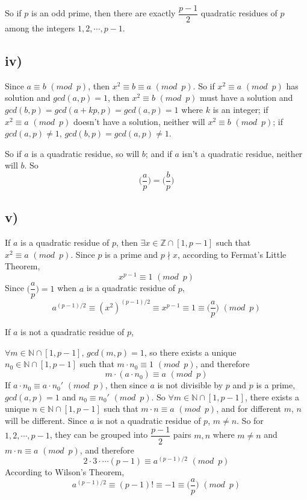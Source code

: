 \documentclass[a4paper,12pt,titlepage]{article}
\begin{document}
So if $p$ is an odd prime, then there are exactly $\dfrac{p-1}{2}$ quadratic residues of $p$ among the integers $1, 2,\cdots,p - 1$.

\subsection*{iv)}
Since $a\equiv b\,\,(mod\,\,\,p)$, then
$x^2\equiv b\equiv a\,\,(mod\,\,\,p)$. So if $x^2\equiv a\,\,(mod\,\,\,p)$ has solution and $gcd(a,p)=1$, then $x^2\equiv b\,\,(mod\,\,\,p)$ must have a solution and $gcd(b,p)=gcd(a+kp,p)=gcd(a,p)=1$ where $k$ is an integer; if $x^2\equiv a\,\,(mod\,\,\,p)$ doesn't have a solution, neither will $x^2\equiv b\,\,(mod\,\,\,p)$; if $gcd(a,p)\neq 1$, $gcd(b,p)=gcd(a,p)\neq 1$.

So if $a$ is a quadratic residue, so will $b$; and if $a$ isn't a quadratic residue, neither will $b$. So 
$$\Big(\dfrac{a}{p}\Big)=\Big(\dfrac{b}{p}\Big)$$

\subsection*{v)}
If $a$ is a quadratic residue of $p$, then $\exists x\in\mathbb{Z}\cap[1,p-1]$ such that $x^2\equiv a\,\,(mod\,\,\,p)$. Since $p$ is a prime and $p\nmid x$, according to Fermat's Little Theorem,
$$x^{p-1}\equiv 1\,\,(mod\,\,\,p)$$
Since $\Big(\dfrac{a}{p}\Big)=1$ when $a$ is a quadratic residue of $p$,  
$$a^{(p-1)/2}\equiv(x^2)^{(p-1)/2}\equiv x^{p-1}\equiv 1\equiv \Big(\dfrac{a}{p}\Big)\,\,(mod\,\,\,p)$$

If  $a$ is not a quadratic residue of $p$, 

$\forall m\in\mathbb{N}\cap[1,p-1]$,  $gcd(m,p)=1$, so there exists a unique $ n_0\in\mathbb{N}\cap[1,p-1]$ such that
$m\cdot n_0\equiv1\,\,(mod\,\,\,p)$, and therefore 
$$m\cdot(a\cdot n_0)\equiv a\,\,(mod\,\,\,p)$$
If $a\cdot n_0\equiv a\cdot n_0'\,\,(mod\,\,\,p)$, then since $a$ is not divisible by $p$ and $p$ is a prime, $gcd(a,p)=1$ and $n_0\equiv n_0'\,\,(mod\,\,\,p)$. So $\forall m\in\mathbb{N}\cap[1,p-1]$, there exists a unique $ n\in\mathbb{N}\cap[1,p-1]$ such that
$m\cdot n\equiv a\,\,(mod\,\,\,p)$, and for different $m$, $n$ will be different. Since $a$ is not a quadratic residue of $p$, $m\neq n$. So for $1,2,\cdots,p-1$, they can be
grouped into $\dfrac{p-1}{2}$ pairs $m, n$ where $m\neq n$ and $m\cdot n\equiv a\,\,(mod\,\,\,p)$, and therefore
$$2\cdot 3\cdot\cdots(p-1)\equiv a^{(p-1)/2}\,\,(mod\,\,\,p)$$
According to Wilson's Theorem, 
$$a^{(p-1)/2}\equiv(p-1)!\equiv -1\equiv \Big(\dfrac{a}{p}\Big)\,\,(mod\,\,\,p)$$
\end{document}

